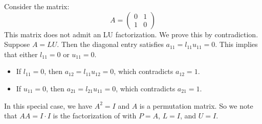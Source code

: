 \documentclass[10pt,twoside]{siamart1116}
\numberwithin{theorem}{section}
\begin{document}
Consider the matrix:
\[
	A = \begin{pmatrix} 0 & 1 \\ 1 & 0 \end{pmatrix}
\]
This matrix does not admit an LU factorization. We prove this by contradiction. Suppose $A = LU$. Then the diagonal entry satisfies $a_{11} = l_{11} u_{11} = 0$. This implies that either $l_{11} = 0$ or $u_{11} = 0$.
\begin{itemize}
	\item If $l_{11} = 0$, then $a_{12} = l_{11} u_{12} = 0$, which contradicts $a_{12} = 1$.
	\item If $u_{11} = 0$, then $a_{21} = l_{21} u_{11} = 0$, which contradicts $a_{21} = 1$.
\end{itemize}

In this special case, we have $A^2 = I$ and $A$ is a permutation matrix. So we note that $A A = I \cdot I$ is the factorization of  with $P = A$, $L = I$, and $U = I$.
\end{document}
